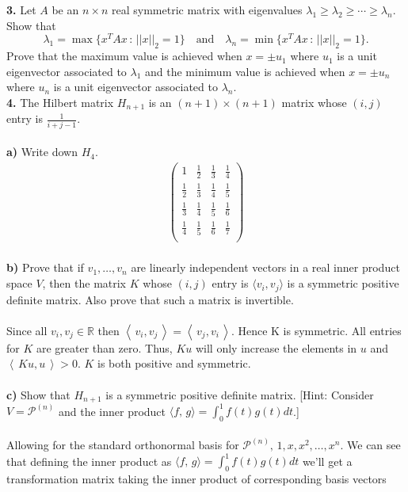 \documentclass[11pt]{amsart}
\theoremstyle{definition}  %
\newcommand{\R}{\mathbb{R}}
\newcommand{\IP}[1]{\left \langle\, #1 \,\right \rangle}
\newcommand{\PP}{\mathcal{P}}
\begin{document}
\vskip 0.1cm
\noindent
{\bf 3.} Let $A$ be an $n \times n$ real symmetric matrix with eigenvalues $\lambda_1 \geq \lambda_2 \geq \cdots \geq \lambda_n$. Show that
$$ \lambda_1 = \max \{ x^T A x \, : \, ||x||_2 = 1\} \quad \mbox{and} \quad \lambda_n = \min \{ x^T A x \, : \, ||x||_2 = 1\}.$$
Prove that the maximum value is achieved when $x = \pm u_1$ where $u_1$ is a unit eigenvector associated to $\lambda_1$ and the minimum value
is achieved when $x=\pm u_n$ where $u_n$ is a unit eigenvector associated to $\lambda_n$. \\

\newpage
\vskip 0.1cm
\noindent
{\bf 4.} The Hilbert matrix $H_{n+1}$ is an $(n+1) \times (n+1)$ matrix whose $(i,j)$ entry is $\frac{1}{i+j-1}$. \\
\\
{\bf a)} Write down $H_4$.
\begin{align*}
	\left ( \begin{array}{cccc}
		1 & \frac{1}{2} & \frac{1}{3} & \frac{1}{4}\\
		\frac{1}{2} & \frac{1}{3} & \frac{1}{4} & \frac{1}{5}\\
		\frac{1}{3} & \frac{1}{4} & \frac{1}{5} & \frac{1}{6}\\
		\frac{1}{4} & \frac{1}{5} & \frac{1}{6} & \frac{1}{7}\\
\end{array}	 \right )
\end{align*}
\\
{\bf b)} Prove that if $v_1, \ldots, v_n$ are linearly independent vectors in a real inner product space $V$, then the matrix $K$ whose $(i,j)$ entry is $\langle v_i, v_j \rangle$ is a symmetric positive definite matrix. Also prove that such a matrix is invertible. \\
\\
Since all $v_i,v_j \in \R$ then $\IP{v_i,v_j}= \IP{v_j,v_i}$.  Hence K is symmetric.  All entries for $K$ are greater than zero.  Thus, $Ku$ will only increase the elements in $u$ and $\IP{Ku,u}>0$.  $K$ is both positive and symmetric.\\
\\
{\bf c)} Show that $H_{n+1}$ is a symmetric positive definite matrix. [Hint: Consider $V = \mathcal{P}^{(n)}$ and the inner product $\langle f, \, g\rangle = \int_0^1 f(t)g(t) dt$.] \\
\\
Allowing for the standard orthonormal basis for $\PP^{(n)},\, 1,x,x^2, \dots, x^n$.  We can see that defining the inner product as $\langle f, \, g\rangle = \int_0^1 f(t)g(t) dt$ we'll get a transformation matrix taking the inner product of corresponding basis vectors
\end{document}
